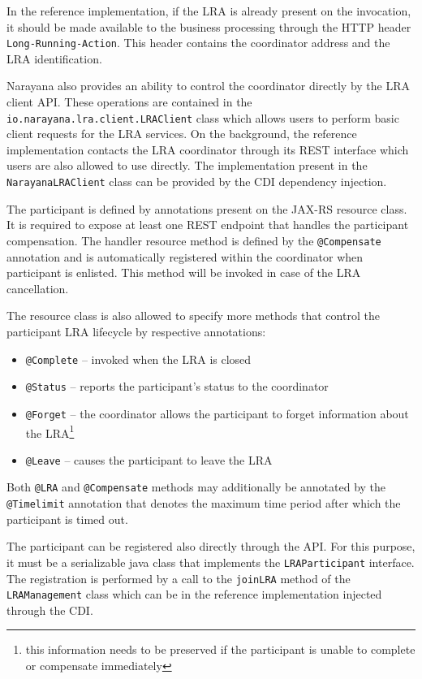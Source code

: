 \documentclass[oneside,
  digital, %
  table,   %
  lof,     %
  lot,     %
]{fithesis3}
\begin{document}
In the reference implementation, if the LRA is already present on the invocation, it should be made available to the business processing through the HTTP header \texttt{Long-Running-Action}. This header contains the coordinator address and the LRA identification.

Narayana also provides an ability to control the coordinator directly by the LRA client API. These operations are contained in the  \texttt{io.narayana.lra.client.LRAClient} class which allows users to perform basic client requests for the LRA services. On the background, the reference implementation contacts the LRA coordinator through its REST interface which users are also allowed to use directly. The implementation present in the \texttt{NarayanaLRAClient} class can be provided by the CDI dependency injection.

The participant is defined by annotations present on the JAX-RS resource class. It is required to expose at least one REST endpoint that handles the participant compensation. The handler resource method is defined by the \texttt{@Compensate} annotation and is automatically registered within the coordinator when participant is enlisted. This method will be invoked in case of the LRA cancellation.

The resource class is also allowed to specify more methods that control the participant LRA lifecycle by respective annotations:

\begin{itemize}
    \item \texttt{@Complete} -- invoked when the LRA is closed
    
    \item \texttt{@Status} -- reports the participant's status to the coordinator
    
    \item \texttt{@Forget} -- the coordinator allows the participant to forget information about the LRA\footnote{this information needs to be preserved if the participant is unable to complete or compensate immediately}
    
    \item \texttt{@Leave} -- causes the participant to leave the LRA
\end{itemize}

Both \texttt{@LRA} and \texttt{@Compensate} methods may additionally be annotated by the \texttt{@Timelimit} annotation that denotes the maximum time period after which the participant is timed out.

The participant can be registered also directly through the API. For this purpose, it must be a serializable java class that implements the \texttt{LRAParticipant} interface. The registration is performed by a call to the \texttt{joinLRA} method of the \texttt{LRAManagement} class which can be in the reference implementation injected through the CDI.
\end{document}
